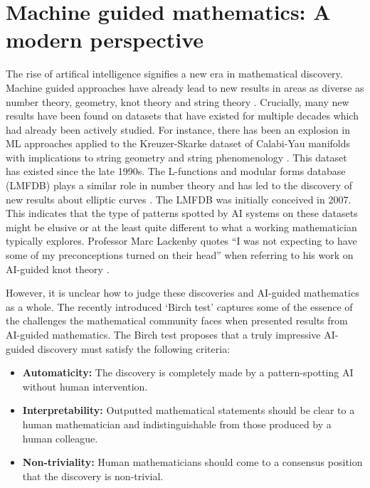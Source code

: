 \section{Machine guided mathematics: A modern perspective}
\label{sec:machine-guided-math}
The rise of artifical intelligence signifies a new era in mathematical discovery. Machine guided approaches have already lead to new results in areas as diverse as number theory, geometry, knot theory and string theory \cite{Davies_2021, Murmurations2024, AGGARWAL2024138517}. Crucially, many new results have been found on datasets that have existed for multiple decades which had already been actively studied. For instance, there has been an explosion in ML approaches applied to the Kreuzer-Skarke dataset \cite{kreuzer2000complete} of Calabi-Yau manifolds with implications to string geometry and string phenomenology \cite{BULL2019700,Berglund2023, hePatternsCalabiYauDistributions2015}. This dataset has existed since the late 1990s. The L-functions and modular forms database (LMFDB) \cite{lmfdb:234446.a} plays a similar role in number theory and has led to the discovery of new results about elliptic curves \cite{Murmurations2024}. The LMFDB was initially conceived in 2007. This indicates that the type of patterns spotted by AI systems on these datasets might be elusive or at the least quite different to what a working mathematician typically explores. Professor Marc Lackenby quotes ``I was not expecting to have some of my preconceptions turned on their head''
when referring to his work on AI-guided knot theory \cite{Davies_2021}.
\par However, it is unclear how to judge these discoveries and AI-guided mathematics as a whole. The recently introduced `Birch test' \cite{heTrium2024} captures some of the essence of the challenges the mathematical community faces when presented results from AI-guided mathematics. The Birch test proposes that a truly impressive AI-guided discovery must satisfy the following criteria:
\begin{itemize}
    \item \textbf{Automaticity:} The discovery is completely made by a pattern-spotting AI without human intervention.
    \item \textbf{Interpretability:} Outputted mathematical statements should be clear to a human mathematician and indistinguishable from those produced by a human colleague.
    \item \textbf{Non-triviality:} Human mathematicians should come to a consensus position that the discovery is non-trivial.
\end{itemize}
